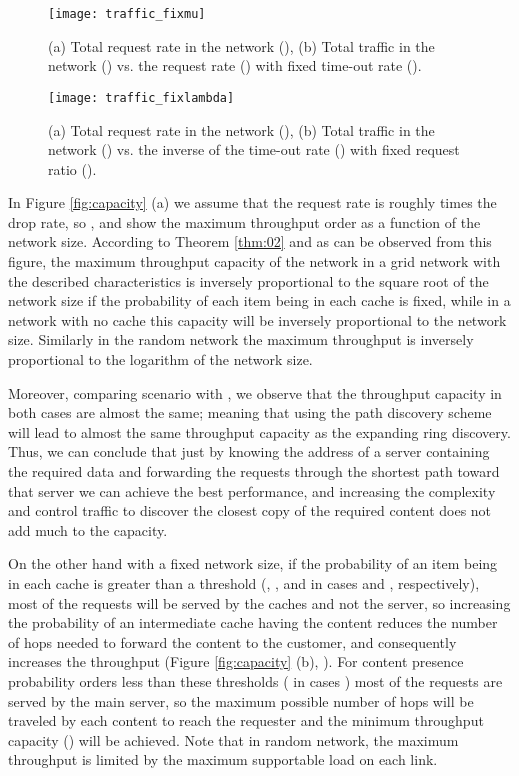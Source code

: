 \documentclass[journal]{IEEEtran}
\theoremstyle{plain}
\theoremstyle{remark}
\begin{document}
\begin{figure}[http]
    \center
			\texttt{[image: traffic\_fixmu]}\\
      \caption{(a) Total request rate in the network (), (b) Total traffic in the network () vs. the request rate () with fixed time-out rate ().}
    \label{fig:traffic_lambda}
\end{figure}

\begin{figure}[http]
    \center
			\texttt{[image: traffic\_fixlambda]}\\
      \caption{(a) Total request rate in the network (), (b) Total traffic in the network () vs. the inverse of the time-out rate () with fixed request ratio ().}
    \label{fig:traffic_mu}
\end{figure}

In Figure \ref{fig:capacity} (a) we assume that the request rate is roughly  times the drop rate, so , and show the maximum throughput order as a function of the network size. According to Theorem \ref{thm:02} and as can be observed from this figure, the maximum throughput capacity of the network in a grid network with the described characteristics is inversely proportional to the square root of the network size if the probability of each item being in each cache is fixed, while in a network with no cache this capacity will be inversely proportional to the network size. Similarly in the random network the maximum throughput is inversely proportional to the logarithm of the network size. 


Moreover, comparing scenario  with , we observe that the throughput capacity in both cases are almost the same; meaning that using the path discovery scheme will lead to almost the same throughput capacity as the expanding ring discovery. Thus, we can conclude that just by knowing the address of a server containing the required data and forwarding the requests through the shortest path toward that server we can achieve the best performance, and increasing the complexity and control traffic to discover the closest copy of the required content does not add much to the capacity. 

On the other hand with a fixed network size, if the probability of an item being in each cache is greater than a threshold (, , and  in cases  and , respectively), most of the requests will be served by the caches and not the server, so increasing the probability of an intermediate cache having the content reduces the number of hops needed to forward the content to the customer, and consequently increases the throughput (Figure \ref{fig:capacity} (b), ). For content presence probability orders less than these thresholds ( in cases ) most of the requests are served by the main server, so the maximum possible number of hops will be traveled by each content to reach the requester and the minimum throughput capacity () will be achieved. Note that in random network, the maximum throughput is limited by the maximum supportable load on each link.
\end{document}
